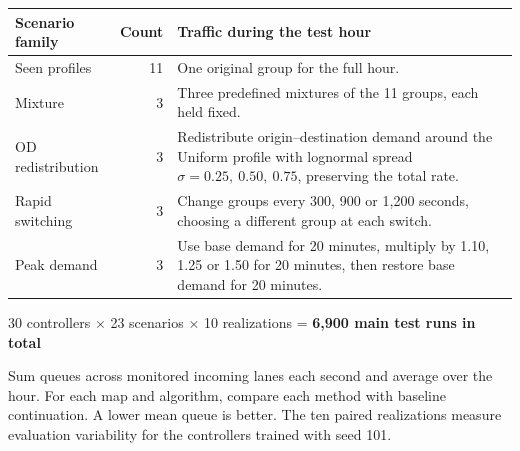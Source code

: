 \documentclass[11pt,a4paper]{article}
\newcommand{\thd}[1]{{\sffamily\bfseries #1}}
\newcommand{\tabsetup}{\small\renewcommand{\arraystretch}{1.22}\setlength{\tabcolsep}{5pt}}
\begin{document}
{\tabsetup\begin{tabularx}{\linewidth}{@{}L{3.3cm}rY@{}}
\toprule\thd{Scenario family} & \thd{Count} & \thd{Traffic during the test hour}\\\midrule
Seen profiles & 11 & One original group for the full hour.\\\addlinespace
Mixture & 3 & Three predefined mixtures of the 11 groups, each held fixed.\\\addlinespace
OD redistribution & 3 & Redistribute origin--destination demand around the Uniform profile with lognormal spread $\sigma=0.25,\ 0.50,\ 0.75$, preserving the total rate.\\\addlinespace
Rapid switching & 3 & Change groups every 300, 900 or 1,200 seconds, choosing a different group at each switch.\\\addlinespace
Peak demand & 3 & Use base demand for 20 minutes, multiply by 1.10, 1.25 or 1.50 for 20 minutes, then restore base demand for 20 minutes.\\\bottomrule
\end{tabularx}}
\smallskip
\noindent\colorbox{mist}{\parbox{\dimexpr\linewidth-2\fboxsep}{\centering\sffamily
\strut 30 controllers $\times$ 23 scenarios $\times$ 10 realizations = \textbf{6,900 main test runs in total}\strut}}

Sum queues across monitored incoming lanes each second and average over the hour. For each map and algorithm, compare each method with baseline continuation. A lower mean queue is better. The ten paired realizations measure evaluation variability for the controllers trained with seed 101.
\end{document}
